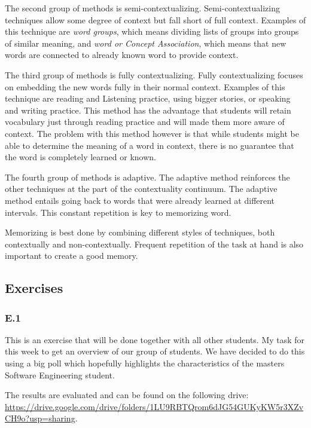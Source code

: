 \documentclass[]{article}
\begin{document}
The second group of methods is semi-contextualizing. Semi-contextualizing techniques allow
some degree of context but fall short of full context. Examples of this technique
are \textit{word groups}, which means dividing lists of groups into groups of similar meaning,
and \textit{word or Concept Association}, which means that new words are 
connected to already known word to provide context.

The third group of methods is fully contextualizing. Fully contextualizing focuses on 
embedding the new words fully in their normal context. Examples of this technique
are reading and Listening practice, using bigger stories, or speaking and writing practice. 
This method has the advantage that students will retain vocabulary just through 
reading practice and will made them more aware of context. The problem with this 
method however is that while students might be able to determine the meaning of 
a word in context, there is no guarantee that the word is completely learned or known.

The fourth group of methods is adaptive. The adaptive method reinforces the other 
techniques at the part of the contextuality continuum. The adaptive method entails 
going back to words that were already learned at different intervals. This 
constant repetition is key to memorizing word. 

Memorizing is best done by combining different styles of techniques, both 
contextually and non-contextually. Frequent repetition of the task at hand is 
also important to create a good memory.

\subsection*{Exercises} 

\subsubsection*{E.1}
This is an exercise that will be done together with all other students. 
My task for this week to get an overview of our group of students. 
We have decided to do this using a big poll which hopefully highlights the 
characteristics of the masters Software Engineering student. 

The results are evaluated and can be found on the following drive:
\url{https://drive.google.com/drive/folders/1LU9RBTQrom6dJG54GUKyKW5r3XZvCH9o?usp=sharing}.
\end{document}
